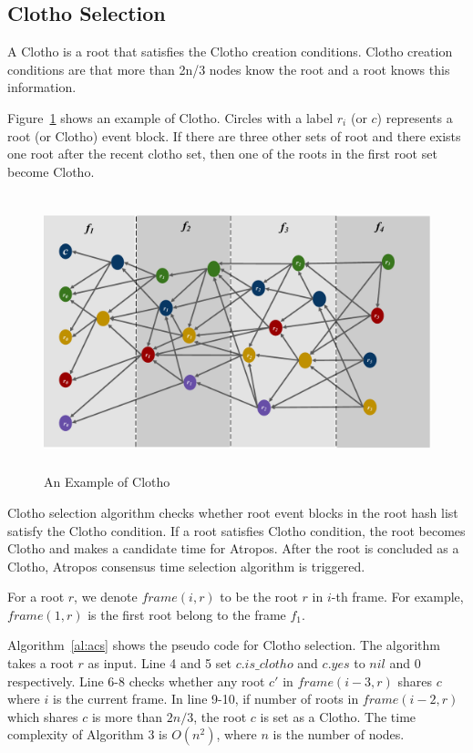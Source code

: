 \documentclass[preprint,12pt]{elsarticle}
\begin{document}
\subsection{Clotho Selection}

A Clotho is a root that satisfies the Clotho creation conditions. 
Clotho creation conditions are that more than 2n/3 nodes know the root and a root knows this information. 

Figure~\ref{fig:Clotho} shows an example of Clotho. Circles with a label $r_i$ (or $c$) represents a root (or Clotho) event block. If there are three other sets of root and there exists one root after the recent clotho set, then one of the roots in the first root set become Clotho.

\begin{figure} [t] \centering  
	\includegraphics[height=8cm, width=1.0\columnwidth]{Clotho_example}
	\caption{An Example of Clotho}
	\label{fig:Clotho}
\end{figure}

Clotho selection algorithm checks whether root event blocks in the root hash list satisfy the Clotho condition.
If a root satisfies Clotho condition, the root becomes Clotho and makes a candidate time for Atropos. After the root is concluded as a Clotho, Atropos consensus time selection algorithm is triggered. 

For a root $r$, we denote $frame(i, r)$ to be the root $r$ in $i$-th frame. For example, $frame(1, r)$ is the first root belong to the frame $f_1$. 

Algorithm~\ref{al:acs} shows the pseudo code for Clotho selection. The algorithm takes a root $r$ as input. 
Line 4 and 5 set $c.is\_clotho$ and $c.yes$ to $nil$ and 0 respectively. Line 6-8 checks whether any root $c'$ in $frame(i-3,r)$ shares $c$ where $i$ is the current frame. In line 9-10, if number of roots in $frame(i-2,r)$ which shares $c$ is more than $2n/3$, the root $c$ is set as a Clotho. The time complexity of Algorithm 3 is $O(n^{2})$, where $n$ is the number of nodes. 
\end{document}
